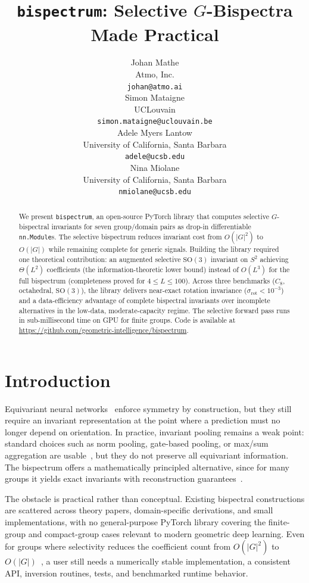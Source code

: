 \documentclass{article}
\title{\texttt{bispectrum}: Selective $G$-Bispectra Made Practical}
\author{%
  Johan Mathe \\
  Atmo, Inc. \\
  \texttt{johan@atmo.ai} \\
  \And
  Simon Mataigne \\
  UCLouvain \\
  \texttt{simon.mataigne@uclouvain.be} \\
  \And
  Adele Myers Lantow \\
  University of California, Santa Barbara \\
  \texttt{adele@ucsb.edu} \\
  \And
  Nina Miolane \\
  University of California, Santa Barbara \\
  \texttt{nmiolane@ucsb.edu} \\
}
\theoremstyle{definition}
\theoremstyle{remark}
\newcommand{\SO}{\mathrm{SO}}
\theoremstyle{definition}
\begin{document}
\maketitle

\begin{abstract}
We present \texttt{bispectrum}, an open-source PyTorch library that computes
selective $G$-bispectral invariants for seven group/domain pairs as
drop-in differentiable \texttt{nn.Module}s.
The selective bispectrum reduces invariant cost from $O(|G|^2)$ to $O(|G|)$
while remaining complete for generic signals.
Building the library required one theoretical contribution:
an augmented selective $\SO(3)$ invariant on $S^2$ achieving
$\Theta(L^2)$ coefficients (the information-theoretic lower
bound) instead of $O(L^3)$ for the full bispectrum
(completeness proved for $4 \le L \le 100$).
Across three benchmarks ($C_8$, octahedral, $\SO(3)$), the library
delivers near-exact rotation invariance
($\sigma_{\mathrm{rot}} < 10^{-3}$) and a data-efficiency advantage of
complete bispectral invariants over incomplete alternatives in the
low-data, moderate-capacity regime.
The selective forward pass runs in sub-millisecond time on GPU for finite
groups. Code is available at \url{https://github.com/geometric-intelligence/bispectrum}.
\end{abstract}
\section{Introduction}
\label{sec:intro}

Equivariant neural networks~\citep{cohen2016group, weiler2019general} enforce
symmetry by construction, but they still require an invariant representation at
the point where a prediction must no longer depend on orientation. In practice,
invariant pooling remains a weak point: standard choices such as norm pooling,
gate-based pooling, or max/sum aggregation are
usable~\citep{weiler2019general}, but they do not preserve all equivariant
information. The bispectrum offers a mathematically principled alternative,
since for many groups it yields exact invariants with reconstruction
guarantees~\citep{kakarala2012bispectrum}.

The obstacle is practical rather than conceptual. Existing bispectral
constructions are scattered across theory papers, domain-specific derivations,
and small implementations, with no general-purpose PyTorch library covering the
finite-group and compact-group cases relevant to modern geometric deep learning.
Even for groups where selectivity reduces the coefficient count from
$O(|G|^2)$ to $O(|G|)$~\citep{mataigne2024selective}, a user still needs a numerically stable implementation,
a consistent API, inversion routines, tests, and benchmarked runtime behavior.
\end{document}
